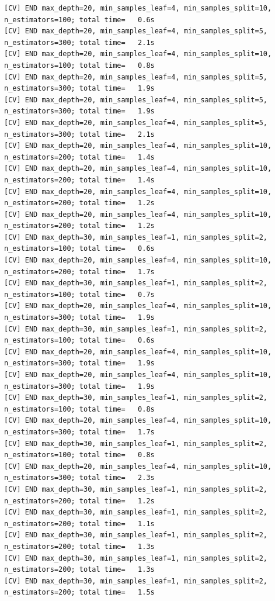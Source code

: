\documentclass[
  11pt,
  letterpaper,
  DIV=11,
  numbers=noendperiod]{scrartcl}
\begin{document}
\begin{verbatim}
[CV] END max_depth=20, min_samples_leaf=4, min_samples_split=10, n_estimators=100; total time=   0.6s
[CV] END max_depth=20, min_samples_leaf=4, min_samples_split=5, n_estimators=300; total time=   2.1s
[CV] END max_depth=20, min_samples_leaf=4, min_samples_split=10, n_estimators=100; total time=   0.8s
[CV] END max_depth=20, min_samples_leaf=4, min_samples_split=5, n_estimators=300; total time=   1.9s
[CV] END max_depth=20, min_samples_leaf=4, min_samples_split=5, n_estimators=300; total time=   1.9s
[CV] END max_depth=20, min_samples_leaf=4, min_samples_split=5, n_estimators=300; total time=   2.1s
[CV] END max_depth=20, min_samples_leaf=4, min_samples_split=10, n_estimators=200; total time=   1.4s
[CV] END max_depth=20, min_samples_leaf=4, min_samples_split=10, n_estimators=200; total time=   1.4s
[CV] END max_depth=20, min_samples_leaf=4, min_samples_split=10, n_estimators=200; total time=   1.2s
[CV] END max_depth=20, min_samples_leaf=4, min_samples_split=10, n_estimators=200; total time=   1.2s
[CV] END max_depth=30, min_samples_leaf=1, min_samples_split=2, n_estimators=100; total time=   0.6s
[CV] END max_depth=20, min_samples_leaf=4, min_samples_split=10, n_estimators=200; total time=   1.7s
[CV] END max_depth=30, min_samples_leaf=1, min_samples_split=2, n_estimators=100; total time=   0.7s
[CV] END max_depth=20, min_samples_leaf=4, min_samples_split=10, n_estimators=300; total time=   1.9s
[CV] END max_depth=30, min_samples_leaf=1, min_samples_split=2, n_estimators=100; total time=   0.6s
[CV] END max_depth=20, min_samples_leaf=4, min_samples_split=10, n_estimators=300; total time=   1.9s
[CV] END max_depth=20, min_samples_leaf=4, min_samples_split=10, n_estimators=300; total time=   1.9s
[CV] END max_depth=30, min_samples_leaf=1, min_samples_split=2, n_estimators=100; total time=   0.8s
[CV] END max_depth=20, min_samples_leaf=4, min_samples_split=10, n_estimators=300; total time=   1.7s
[CV] END max_depth=30, min_samples_leaf=1, min_samples_split=2, n_estimators=100; total time=   0.8s
[CV] END max_depth=20, min_samples_leaf=4, min_samples_split=10, n_estimators=300; total time=   2.3s
[CV] END max_depth=30, min_samples_leaf=1, min_samples_split=2, n_estimators=200; total time=   1.2s
[CV] END max_depth=30, min_samples_leaf=1, min_samples_split=2, n_estimators=200; total time=   1.1s
[CV] END max_depth=30, min_samples_leaf=1, min_samples_split=2, n_estimators=200; total time=   1.3s
[CV] END max_depth=30, min_samples_leaf=1, min_samples_split=2, n_estimators=200; total time=   1.3s
[CV] END max_depth=30, min_samples_leaf=1, min_samples_split=2, n_estimators=200; total time=   1.5s

\end{verbatim}
\end{document}
